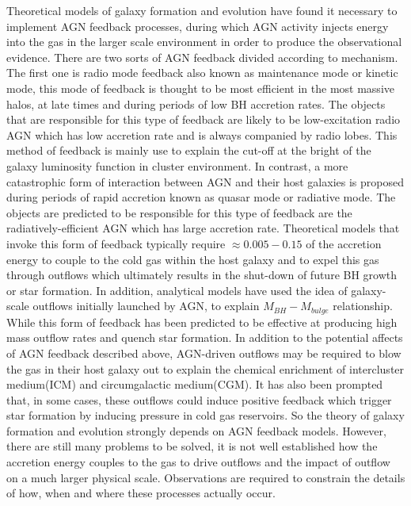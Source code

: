 \documentclass[../main.tex]{subfiles}
\begin{document}
Theoretical models of galaxy formation and evolution have found it necessary to implement AGN feedback processes, during which AGN activity injects energy into the gas in the larger scale environment in order to produce the observational evidence. There are two sorts of AGN feedback divided according to mechanism. The first one is radio mode feedback also known as maintenance mode or kinetic mode, this mode of feedback is  thought to be most efficient in the most massive halos, at late times and during periods of low BH accretion rates. The objects that are responsible for this type of feedback are likely to be low-excitation radio AGN which has low accretion rate and is always companied by radio lobes. This method of feedback is mainly use to explain the cut-off at the bright of the galaxy luminosity function in cluster environment. In contrast, a more catastrophic form of interaction between AGN and their host galaxies is proposed during periods of rapid accretion known as quasar mode or radiative mode. The objects are predicted to be responsible for this type of feedback are the radiatively-efficient AGN which has large accretion rate. Theoretical models that invoke this form of feedback typically require $\approx 0.005-0.15$ of the accretion energy to couple to the cold gas within the host galaxy and to expel this gas through outflows which ultimately results in the shut-down of future BH growth or star formation. In addition, analytical models have used the idea of galaxy-scale outflows initially launched by AGN, to explain $M_{BH}-M_{bulge}$ relationship. While this form of feedback has been predicted to be effective at producing high mass outflow rates and quench star formation. In addition to the potential affects of AGN feedback described above, AGN-driven outflows may be required to blow the gas in their host galaxy out to explain the chemical enrichment of intercluster medium(ICM) and circumgalactic medium(CGM). It has also been prompted that, in some cases, these outflows could induce positive feedback which trigger star formation by inducing pressure in cold gas reservoirs. So the theory of galaxy formation and evolution strongly depends on AGN feedback models. However, there are still many problems to be solved, it is not well established how the accretion energy couples to the gas to drive outflows and the impact of outflow on a much larger physical scale. Observations are required to constrain the details of how, when and where these processes actually occur.
\end{document}
